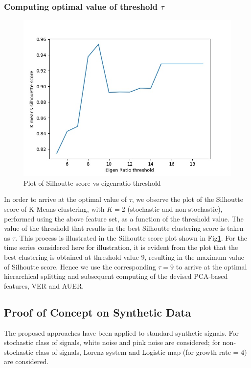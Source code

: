 \documentclass[journal]{IEEEtran}
\begin{document}
	\subsubsection{ Computing optimal value of threshold $\tau$} \label{compute_threshold}

		\begin{figure}[ht]
		\centering
		\includegraphics[width=0.8\linewidth]{threshold_vs_silhoutte_score.jpg}
		\caption{Plot of Silhoutte score vs eigenratio threshold}
		\label{sill}
	\end{figure}



	In order to arrive at the optimal value of $\tau$, we observe  the plot of the Silhoutte score of K-Means clustering, with $K=2$ (stochastic and non-stochastic), performed using the above feature set, as a function of the threshold value. The value of the threshold that results in the best Silhoutte clustering score is taken as $\tau$. This process is illustrated in the Silhoutte score plot shown in Fig\ref{sill}. For the time series considered here for illustration, it is evident from the plot that the best clustering is obtained at threshold value 9, resulting in the maximum value of Silhoutte score. Hence we use the corresponding $\tau = 9$ to arrive at the optimal hierarchical splitting and subsequent computing of the devised PCA-based features, VER and AUER.

	\subsection{Proof of Concept on Synthetic Data}
	The proposed approaches have been applied to standard synthetic signals. For stochastic class of signals, white noise and pink noise are considered; for non-stochastic class of signals, Lorenz system and Logistic map (for growth rate = 4) are considered.
	
\end{document}
